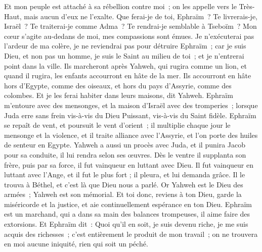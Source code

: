 \begin{multicols}{2}
Et mon peuple est attaché à sa rébellion contre moi~; on les appelle vers le Très-Haut, mais aucun d'eux ne l'exalte.
Que ferai-je de toi, Ephraïm~? Te livrerais-je, Israël~? Te traiterai-je comme Adma~? Te rendrai-je semblable à Tseboïm~? Mon cœur s'agite au-dedans de moi, mes compassions sont émues.
Je n'exécuterai pas l'ardeur de ma colère, je ne reviendrai pas pour détruire Ephraïm~; car je suis Dieu, et non pas un homme, je suis le Saint au milieu de toi~; et je n'entrerai point dans la ville.
Ils marcheront après Yahweh, qui rugira comme un lion, et quand il rugira, les enfants accourront en hâte de la mer.
Ils accourront en hâte hors d'Egypte, comme des oiseaux, et hors du pays d'Assyrie, comme des colombes. Et je les ferai habiter dans leurs maisons, dit Yahweh.
\VerseOne{}Ephraïm m'entoure avec des mensonges, et la maison d'Israël avec des tromperies~; lorsque Juda erre sans frein vis-à-vis du Dieu Puissant, vis-à-vis du Saint fidèle.
Ephraïm se repaît de vent, et poursuit le vent d'orient~; il multiplie chaque jour le mensonge et la violence, et il traite alliance avec l'Assyrie, et l'on porte des huiles de senteur en Egypte.
Yahweh a aussi un procès avec Juda, et il punira Jacob pour sa conduite, il lui rendra selon ses œuvres.
Dès le ventre il supplanta son frère, puis par sa force, il fut vainqueur en luttant avec Dieu.
Il fut vainqueur en luttant avec l'Ange, et il fut le plus fort ; il pleura, et lui demanda grâce. Il le trouva à Béthel, et c'est là que Dieu nous a parlé.
Or Yahweh est le Dieu des armées~; Yahweh est son mémorial.
Et toi donc, reviens à ton Dieu, garde la miséricorde et la justice, et aie continuellement espérance en ton Dieu.
Ephraïm est un marchand, qui a dans sa main des balances trompeuses, il aime faire des extorsions.
Et Ephraïm dit~: Quoi qu'il en soit, je suis devenu riche, je me suis acquis des richesses~; c'est entièrement le produit de mon travail~; on ne trouvera en moi aucune iniquité, rien qui soit un péché.

\end{multicols}
